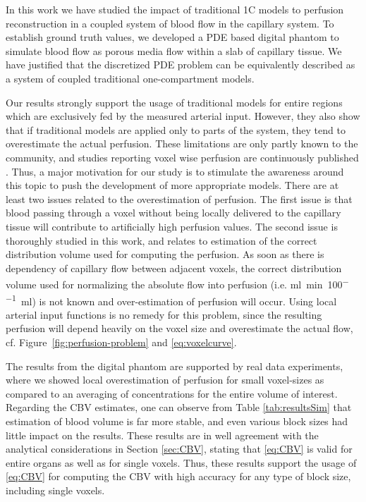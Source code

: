\documentclass[journal,twocolumn]{IEEEtran}
\newcommand{\siPml}{\milli\litre\per\minute\per100\milli\litre}
\begin{document}
	
	In this work we have studied the impact of traditional 1C models to perfusion reconstruction in a coupled system of blood flow in the capillary system.
	To establish ground truth values, we developed a PDE based digital phantom to simulate blood flow as porous media flow within a slab of capillary tissue.
	We have justified that the discretized PDE problem can be equivalently described as a system of coupled traditional one-compartment models.	
	
	Our results strongly support the usage of traditional models for entire regions which are exclusively fed by the measured arterial input.
	However, they also show that if traditional models are applied only to parts of the system, they tend to overestimate the actual perfusion. 
	These limitations are only partly known to the community, and studies reporting voxel wise perfusion are continuously published \cite{Mokin16,Man15,Kickingereder15}. 
	Thus, a major motivation for our study is to stimulate the awareness around this topic to push the development of more appropriate models.
	There are at least two issues related to the overestimation of perfusion. 
	The first issue is that blood passing through a voxel without being locally delivered to the capillary tissue will contribute to artificially high perfusion values. 
	The second issue is thoroughly studied in this work, and relates to estimation of the correct distribution volume used for computing the perfusion. As soon as there is dependency of capillary flow between adjacent voxels, the correct distribution volume used for normalizing the absolute flow into perfusion (i.e. \si{\siPml}) is not known and over-estimation of perfusion will occur. 
	Using local arterial input functions is no remedy for this problem, since the resulting perfusion will depend heavily on the voxel size and overestimate the actual flow, cf. Figure~\ref{fig:perfusion-problem} and \eqref{eq:voxelcurve}.
	
	The results from the digital phantom are supported by real data experiments, where we showed local overestimation of perfusion for small voxel-sizes as compared to an averaging of concentrations for the entire volume of interest.
	Regarding the CBV estimates, one can observe from Table \ref{tab:resultsSim} that estimation of blood volume is far more stable, and  even various block sizes had little impact on the results. 
	These results are in well agreement with the analytical considerations in Section \ref{sec:CBV}, stating that \eqref{eq:CBV} is valid for entire organs as well as for single voxels. 
	Thus, these results support the usage of \eqref{eq:CBV} for computing the CBV with high accuracy for any type of block size, including single voxels.
	
\end{document}
